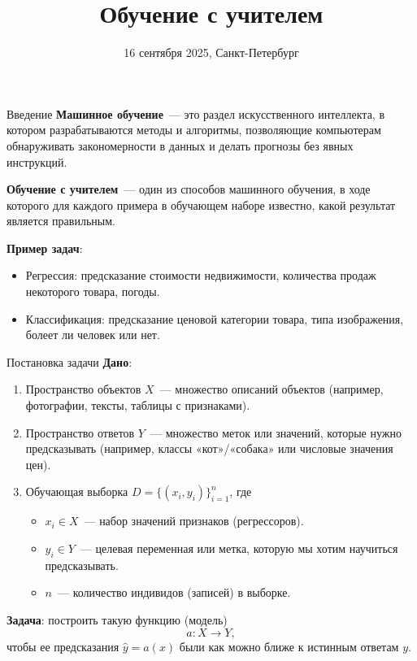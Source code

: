 \documentclass[notheorems, handout]{beamer}
\title[Статистическое и машинное обучение]{Обучение с учителем}
\institute[Санкт-Петербургский Государственный Университет]{%
	\small
	Санкт-Петербургский государственный университет\\
	Кафедра статистического моделирования
}
\date{16 сентября 2025, Санкт-Петербург}
\begin{document}
\begin{frame}
	\titlepage
\end{frame}

\begin{frame}{Введение}
	\textbf{Машинное обучение}~--- это раздел искусственного интеллекта, в котором разрабатываются методы и алгоритмы, позволяющие компьютерам обнаруживать закономерности в данных и делать прогнозы без явных инструкций.\medskip

	\textbf{Обучение с учителем}~--- один из способов машинного обучения, в ходе которого для каждого примера в обучающем наборе известно, какой результат является правильным.\medskip

	\textbf{Пример задач}:
	\begin{itemize}
		\item Регрессия: предсказание стоимости недвижимости, количества продаж некоторого товара, погоды.
		\item Классификация: предсказание ценовой категории товара, типа изображения, болеет ли человек или нет.
	\end{itemize}
\end{frame}

\begin{frame}{Постановка задачи}
	\textbf{Дано}:
	\begin{enumerate}
		\item Пространство объектов $X$~--- множество описаний объектов (например, фотографии, тексты, таблицы с признаками).
		\item Пространство ответов $Y$~--- множество меток или значений, которые нужно предсказывать (например, классы «кот»/«собака» или числовые значения цен).
		\item Обучающая выборка $D = \{(x_i, y_i)\}_{i=1}^n$, где
		      \begin{itemize}
			      \item $x_i \in X$~--- набор значений признаков (регрессоров).
			      \item $y_i \in Y$~--- целевая переменная или метка, которую мы хотим научиться предсказывать.
			      \item $n$~--- количество индивидов (записей) в выборке.
		      \end{itemize}
	\end{enumerate}

	\textbf{Задача}: построить такую функцию (модель)
	\[
		a:X\longrightarrow Y,
	\]
	чтобы ее предсказания $\hat y=a(x)$ были как можно ближе к истинным ответам $y$.
\end{frame}
\end{document}
